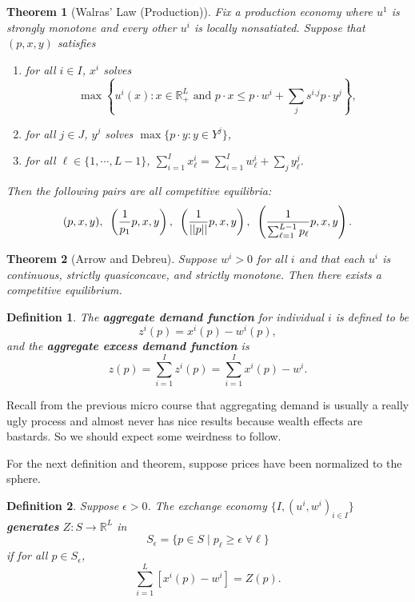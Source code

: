 \documentclass[11pt, twocolumn]{article}
\newcommand{\R}{\mathbb{R}}
\newtheorem{theorem}{Theorem}
\newtheorem{definition}{Definition}
\theoremstyle{definition}
\begin{document}
\begin{theorem}[Walras' Law (Production)]
	Fix a production economy where $u^1$ is strongly monotone and every other $u^i$ is locally nonsatiated. Suppose that $(p,x,y)$ satisfies
	\begin{enumerate}	
		\item for all $i \in I$, $x^i$ solves   \small
			\[ \max \left\{u^i(x) : x \in \R^L_+ \text{ and } p \cdot x \leq p \cdot w^i + \sum_j s^{i.j} p \cdot y^j \right\},	\]
		\item \normalsize for all $ j \in J$, $y^j$ solves $\max\{p \cdot y : y \in Y^j \}$,		
		\item for all $\ell \in \{1, \cdots, L-1 \}$, $\sum_{i=1}^I x^i_{\ell} = \sum_{i=1}^I w^i_{\ell} + \sum_j y_{\ell}^j$.
	\end{enumerate}
	Then the following pairs are all competitive equilibria: \small
	\[(p,x,y), \enskip \left( \frac{1}{p_1}p, x,y \right), \enskip \left( \frac{1}{||p||}p, x,y\right), \enskip \left( \frac{1}{\sum_{\ell=1}^{L-1} p_{\ell}} p,x,y\right).	\]	
\end{theorem}



\begin{theorem}[Arrow and Debreu]
	Suppose $w^i > 0$ for all $i$ and that each $u^i$ is continuous, strictly quasiconcave, and strictly monotone. Then there exists a competitive equilibrium. 
\end{theorem}

\begin{definition}
	The \textbf{aggregate demand function} for individual $i$ is defined to be
		\[z^i(p)= x^i(p) - w^i(p),	\]	
	and the \textbf{aggregate excess demand function} is
	\[z(p)= \sum_{i=1}^I z^i(p) = \sum_{i=1}^I x^i(p) - w^i.		\]
\end{definition}
Recall from the previous micro course that aggregating demand is usually a really ugly process and almost never has nice results because wealth effects are bastards. So we should expect some weirdness to follow. 

For the next definition and theorem, suppose prices have been normalized to the sphere. 

\begin{definition}
	Suppose $\epsilon > 0$. The exchange economy $\{ I, (u^i, w^i)_{i \in I} \}$ \textbf{generates} $Z:S \rightarrow \R^L$ in
	\[S_{\epsilon} = \{p \in S \; | \; p_{\ell} \geq \epsilon  \; \forall \ell \}	\]	
if for all $p \in S_{\epsilon}$, 
	\[	\sum_{i=1}^L [x^i(p) - w^i] = Z(p).\]
		
\end{definition}
\end{document}
